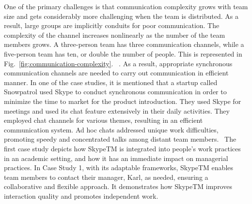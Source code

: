 \documentclass[runningheads]{llncs}
\begin{document}
One of the primary challenges is that communication complexity grows with team size and gets considerably more challenging when the team is distributed. As a result, large groups are implicitly conduits for poor communication. The complexity of the channel increases nonlinearly as the number of the team members grows. A three-person team has three communication channels, while a five-person team has ten, or double the number of people. This is represented in Fig.~\ref{fig:communication-complexity}. ~\cite{refpaper6}. As a result, appropriate synchronous communication channels are needed to carry out communication in efficient manner. In one of the case studies, it is mentioned that a startup called Snowpatrol used Skype to conduct synchronous communication in order to minimize the time to market for the product introduction. They used Skype for meetings and used its chat feature extensively in their daily activities. They employed chat channels for various themes, resulting in an efficient communication system. Ad hoc chats addressed unique work difficulties, promoting speedy and concentrated talks among distant team members.~\cite{refpaper7} The first case study depicts how SkypeTM is integrated into people's work practices in an academic setting, and how it has an immediate impact on managerial practices. In Case Study 1, with its adaptable frameworks, SkypeTM enables team members to contact their manager, Karl, as needed, ensuring a collaborative and flexible approach. It demonstrates how SkypeTM improves interaction quality and promotes independent work.~\cite{refpaper7}
\end{document}
